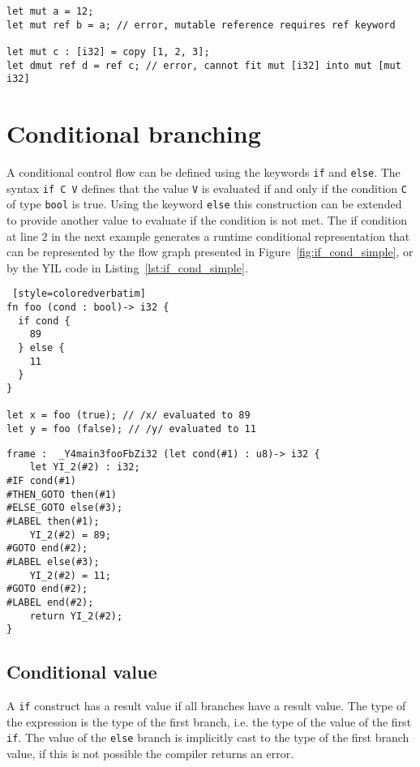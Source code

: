 \begin{lstlisting}[style=coloredverbatim]
let mut a = 12;
let mut ref b = a; // error, mutable reference requires ref keyword

let mut c : [i32] = copy [1, 2, 3];
let dmut ref d = ref c; // error, cannot fit mut [i32] into mut [mut i32]
\end{lstlisting}

\section{Conditional branching}%
\label{sec:if_else}

A conditional control flow can be defined using the keywords \texttt{if} and
\texttt{else}. The syntax \texttt{if C V} defines that the value \texttt{V} is
evaluated if and only if the condition \texttt {C} of type \texttt {bool} is
true. Using the keyword \texttt{else} this construction can be extended to
provide another value to evaluate if the condition is not met. The if condition
at line 2 in the next example generates a runtime conditional representation
that can be represented by the flow graph presented in
Figure~\ref{fig:if_cond_simple}, or by the YIL code in
Listing~\ref{lst:if_cond_simple}.

\begin{lstlisting} [style=coloredverbatim]
fn foo (cond : bool)-> i32 {
  if cond {
    89
  } else {
    11
  }
}

let x = foo (true); // /x/ evaluated to 89
let y = foo (false); // /y/ evaluated to 11
\end{lstlisting}



\begin{lstlisting}[style=intermediateVerb, caption=Simple condition, label=lst:if_cond_simple]
frame :  _Y4main3fooFbZi32 (let cond(#1) : u8)-> i32 {
    let YI_2(#2) : i32;
#IF cond(#1)
#THEN_GOTO then(#1)
#ELSE_GOTO else(#3);
#LABEL then(#1);
    YI_2(#2) = 89;
#GOTO end(#2);
#LABEL else(#3);
    YI_2(#2) = 11;
#GOTO end(#2);
#LABEL end(#2);
    return YI_2(#2);
}
\end{lstlisting}


\subsection {Conditional value}

A \texttt{if} construct has a result value if all branches have a result value.
The type of the expression is the type of the first branch, i.e. the type of the
value of the first \texttt{if}. The value of the \texttt{else} branch is
implicitly cast to the type of the first branch value, if this is not possible
the compiler returns an error.

